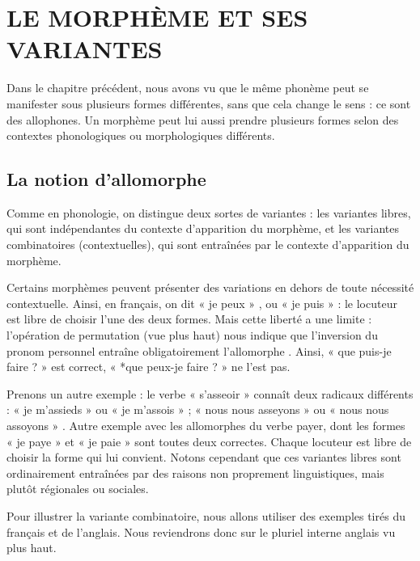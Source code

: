 \section{LE MORPHÈME ET SES VARIANTES}
Dans le chapitre précédent, nous avons vu que le même phonème peut se manifester sous plusieurs formes différentes, sans que cela change le sens : ce sont des allophones. Un morphème peut lui aussi prendre plusieurs formes selon des contextes phonologiques ou morphologiques différents.

\subsection{La notion d’allomorphe}
Comme en phonologie, on distingue deux sortes de variantes : les variantes libres, qui sont
indépendantes du contexte d’apparition du morphème, et les variantes combinatoires (contextuelles), qui sont entraînées par le contexte d’apparition du morphème.

Certains morphèmes peuvent présenter des variations en dehors de toute nécessité contextuelle. Ainsi, en français, on dit « je peux » \bipa{[ʒə pø]}, ou « je puis » \bipa{[ʒə pyi]} : le locuteur est libre de choisir l’une des deux formes. Mais cette liberté a une limite : l’opération de permutation (vue plus haut) nous indique que l’inversion du pronom personnel entraîne obligatoirement l’allomorphe \bipa{[pyi]}. Ainsi, « que puis-je faire ? » est correct, « *que peux-je faire ? » ne l’est pas.

Prenons un autre exemple : le verbe « s’asseoir » connaît deux radicaux différents : « je m’assieds » \bipa{[ʒə masje]} ou « je m’assois » \bipa{[ʒə maswa]} ; « nous nous asseyons »  ou « nous nous assoyons » . Autre exemple avec les allomorphes du verbe payer, dont les formes « je paye » et « je paie » sont toutes deux correctes. Chaque locuteur est libre de choisir la forme qui lui convient. Notons cependant que ces variantes libres sont ordinairement entraînées par des raisons non proprement linguistiques, mais plutôt régionales ou sociales.

Pour illustrer la variante combinatoire, nous allons utiliser des exemples tirés du français et de l’anglais. Nous reviendrons donc sur le pluriel interne anglais vu plus haut.

